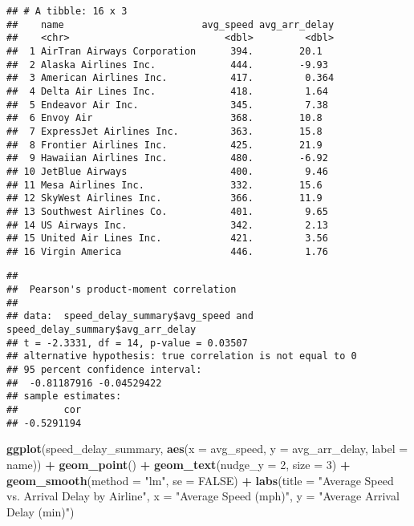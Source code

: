\documentclass[
]{article}
\newenvironment{Shaded}{\begin{snugshade}}{\end{snugshade}}
\newcommand{\AttributeTok}[1]{\textcolor[rgb]{0.13,0.29,0.53}{#1}}
\newcommand{\ConstantTok}[1]{\textcolor[rgb]{0.56,0.35,0.01}{#1}}
\newcommand{\DecValTok}[1]{\textcolor[rgb]{0.00,0.00,0.81}{#1}}
\newcommand{\FunctionTok}[1]{\textcolor[rgb]{0.13,0.29,0.53}{\textbf{#1}}}
\newcommand{\NormalTok}[1]{#1}
\newcommand{\SpecialCharTok}[1]{\textcolor[rgb]{0.81,0.36,0.00}{\textbf{#1}}}
\newcommand{\StringTok}[1]{\textcolor[rgb]{0.31,0.60,0.02}{#1}}
\begin{document}
\begin{verbatim}
## # A tibble: 16 x 3
##    name                        avg_speed avg_arr_delay
##    <chr>                           <dbl>         <dbl>
##  1 AirTran Airways Corporation      394.        20.1  
##  2 Alaska Airlines Inc.             444.        -9.93 
##  3 American Airlines Inc.           417.         0.364
##  4 Delta Air Lines Inc.             418.         1.64 
##  5 Endeavor Air Inc.                345.         7.38 
##  6 Envoy Air                        368.        10.8  
##  7 ExpressJet Airlines Inc.         363.        15.8  
##  8 Frontier Airlines Inc.           425.        21.9  
##  9 Hawaiian Airlines Inc.           480.        -6.92 
## 10 JetBlue Airways                  400.         9.46 
## 11 Mesa Airlines Inc.               332.        15.6  
## 12 SkyWest Airlines Inc.            366.        11.9  
## 13 Southwest Airlines Co.           401.         9.65 
## 14 US Airways Inc.                  342.         2.13 
## 15 United Air Lines Inc.            421.         3.56 
## 16 Virgin America                   446.         1.76
\end{verbatim}

\begin{Shaded}
\end{Shaded}

\begin{verbatim}
## 
##  Pearson's product-moment correlation
## 
## data:  speed_delay_summary$avg_speed and speed_delay_summary$avg_arr_delay
## t = -2.3331, df = 14, p-value = 0.03507
## alternative hypothesis: true correlation is not equal to 0
## 95 percent confidence interval:
##  -0.81187916 -0.04529422
## sample estimates:
##        cor 
## -0.5291194
\end{verbatim}

\begin{Shaded}
\begin{Highlighting}[]
\FunctionTok{ggplot}\NormalTok{(speed\_delay\_summary, }\FunctionTok{aes}\NormalTok{(}\AttributeTok{x =}\NormalTok{ avg\_speed, }\AttributeTok{y =}\NormalTok{ avg\_arr\_delay, }\AttributeTok{label =}\NormalTok{ name)) }\SpecialCharTok{+}
  \FunctionTok{geom\_point}\NormalTok{() }\SpecialCharTok{+}
  \FunctionTok{geom\_text}\NormalTok{(}\AttributeTok{nudge\_y =} \DecValTok{2}\NormalTok{, }\AttributeTok{size =} \DecValTok{3}\NormalTok{) }\SpecialCharTok{+}
  \FunctionTok{geom\_smooth}\NormalTok{(}\AttributeTok{method =} \StringTok{"lm"}\NormalTok{, }\AttributeTok{se =} \ConstantTok{FALSE}\NormalTok{) }\SpecialCharTok{+}
  \FunctionTok{labs}\NormalTok{(}\AttributeTok{title =} \StringTok{"Average Speed vs. Arrival Delay by Airline"}\NormalTok{,}
       \AttributeTok{x =} \StringTok{"Average Speed (mph)"}\NormalTok{,}
       \AttributeTok{y =} \StringTok{"Average Arrival Delay (min)"}\NormalTok{)}
\end{Highlighting}
\end{Shaded}
\end{document}
